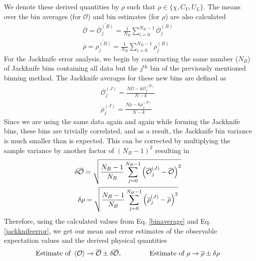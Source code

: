 \documentclass[../thesis_main.tex]{subfiles}
\begin{document}
We denote these derived quantities by $\rho $ such that $\rho \in \{\chi , C_V, U_L\}$. The means over the bin averages (for $\mathcal{O}$) and bin estimates (for $\rho $) are also calculated
\begin{subequations}
    \begin{gather}
        \overline{\mathcal{O}} = \overline{\overline{\mathcal{O}}^{(B)}_j} = \frac{1}{N_B} \sum_{i=0}^{N_B-1} \overline{\mathcal{O}}^{(B)}_j \\
        \overline{\mathcal{\rho }} = \overline{{\rho }^{(B)}_j} = \frac{1}{N_B} \sum_{i=0}^{N_B-1} {\rho }^{(B)}_j
    \end{gather}       
    \label{binaverage} 
\end{subequations}
\!\!\!For the Jackknife error analysis, we begin by constructing the same number ($N_B$) of Jackknife bins containing all data but the $j^\text{th}$ bin of the previously mentioned binning method. The Jackknife averages for these new bins are defined as 
\begin{gather}
    \overline{\mathcal{O}}^{(J)}_j = \frac{N\overline{\mathcal{O}} - k \overline{\mathcal{O}}^{(B)}_j}{N - k} \\
    \overline{\rho }^{(J)}_j = \frac{N\overline{\rho } - k {\rho}^{(B)}_j}{N - k}
\end{gather}          
Since we are using the same data again and again while forming the Jackknife bins, these bins are trivially correlated, and as a result, the Jackknife bin variance is much smaller than is expected. This can be corrected by multiplying the sample variance by another factor of $(N_B-1)^2$ resulting in 
\begin{subequations}
    \begin{gather}
        \delta \overline{\mathcal{O}} = \sqrt{\frac{N_B-1}{N_B} \sum_{j=0}^{N_B-1}\qty(\overline{\mathcal{O}}^{(J)}_j - \overline{\mathcal{O}})^2} \\
        \delta \rho  = \sqrt{\frac{N_B-1}{N_B} \sum_{j=0}^{N_B-1}\qty(\overline{\rho }^{(J)}_j - \overline{\rho})^2}
    \end{gather}     
    \label{jackknifeerror}
\end{subequations}
\!\!\!Therefore, using the calculated values from Eq. \eqref{binaverage} and Eq. \eqref{jackknifeerror}, we get our mean and error estimates of the observable expectation values and the derived physical quantities
\[
    \text{Estimate of }\expval{\mathcal{O}} \rightarrow \overline{\mathcal{O}} \pm \delta \overline{\mathcal{O}}, \qquad\qquad \text{Estimate of }{\rho } \rightarrow \overline{\rho } \pm \delta {\rho } 
\]
\end{document}
